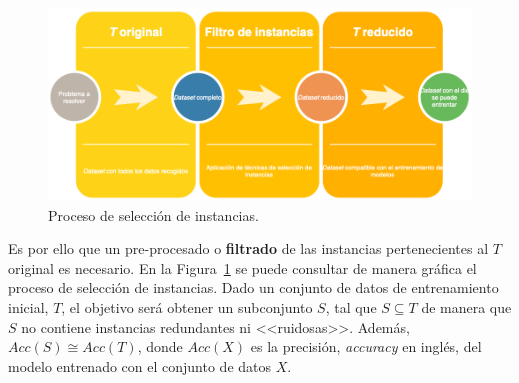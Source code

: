 \begin{figure}
\centering
\includegraphics[width=\linewidth]{../img/memoria/Instance-Selection-Overview}
\caption{Proceso de selección de instancias.}
\label{fig:instance-election-overview}
\end{figure}

Es por ello que un pre-procesado o \textbf{filtrado} de las instancias pertenecientes al $T$ original es necesario. En la Figura~\ref{fig:instance-election-overview} se puede consultar de manera gráfica el proceso de selección de instancias. Dado un conjunto de datos de entrenamiento inicial, $T$, el objetivo será obtener un subconjunto $S$, tal que $S \subseteq T$ de manera que $S$ no contiene instancias redundantes ni <<ruidosas>>. Además, $Acc(S) \cong Acc(T)$, donde $Acc(X)$ es la precisión, \textit{accuracy} en inglés, del modelo entrenado con el conjunto de datos $X$.

